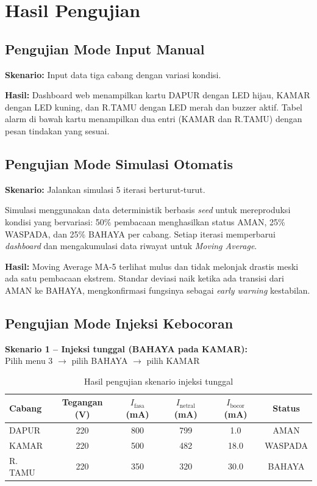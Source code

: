 \documentclass[12pt,a4paper]{article}
\begin{document}
\section{Hasil Pengujian}

\subsection{Pengujian Mode Input Manual}

\textbf{Skenario:} Input data tiga cabang dengan variasi kondisi.

\textbf{Hasil:} Dashboard web menampilkan kartu DAPUR dengan LED hijau, KAMAR
dengan LED kuning, dan R.TAMU dengan LED merah dan buzzer aktif. Tabel alarm di
bawah kartu menampilkan dua entri (KAMAR dan R.TAMU) dengan pesan tindakan yang
sesuai.

\subsection{Pengujian Mode Simulasi Otomatis}

\textbf{Skenario:} Jalankan simulasi 5 iterasi berturut-turut.

Simulasi menggunakan data deterministik berbasis \emph{seed} untuk mereproduksi
kondisi yang bervariasi: 50\% pembacaan menghasilkan status AMAN, 25\% WASPADA,
dan 25\% BAHAYA per cabang. Setiap iterasi memperbarui \emph{dashboard} dan
mengakumulasi data riwayat untuk \emph{Moving Average}.

\textbf{Hasil:} Moving Average MA-5 terlihat mulus dan tidak melonjak drastis
meski ada satu pembacaan ekstrem. Standar deviasi naik ketika ada transisi dari
AMAN ke BAHAYA, mengkonfirmasi fungsinya sebagai \emph{early warning} kestabilan.

\subsection{Pengujian Mode Injeksi Kebocoran}

\textbf{Skenario 1 -- Injeksi tunggal (BAHAYA pada KAMAR):}\\
Pilih menu 3 $\to$ pilih BAHAYA $\to$ pilih KAMAR

\begin{table}[H]
    \centering
    \caption{Hasil pengujian skenario injeksi tunggal}
    \begin{tabular}{lccccc}
        \toprule
        \textbf{Cabang} & \textbf{Tegangan (V)} & \textbf{$I_\text{fasa}$ (mA)}
            & \textbf{$I_\text{netral}$ (mA)} & \textbf{$I_\text{bocor}$ (mA)}
            & \textbf{Status} \\
        \midrule
        DAPUR   & 220 & 800 & 799 & 1.0  & AMAN     \\
        KAMAR   & 220 & 500 & 482 & 18.0 & WASPADA  \\
        R. TAMU & 220 & 350 & 320 & 30.0 & BAHAYA   \\
        \bottomrule
    \end{tabular}
\end{table}
\end{document}
